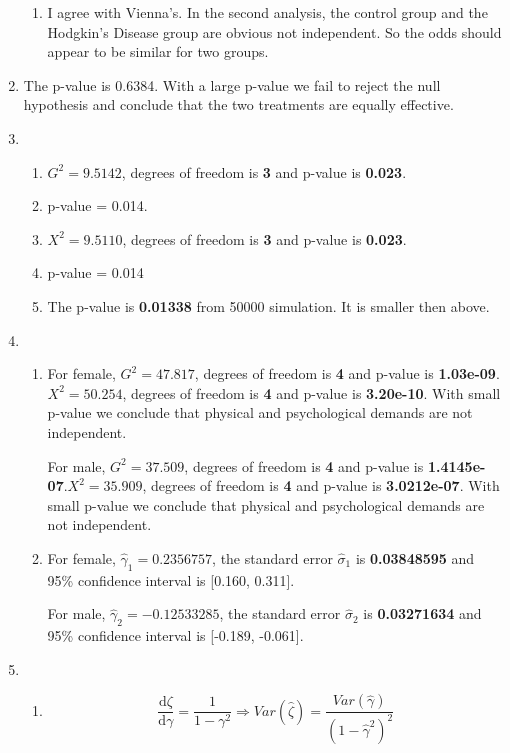 \documentclass{article}
\begin{document}
\begin{enumerate}[leftmargin = 0 em, label = \arabic*., font = \bfseries]
\begin{enumerate}
		\item 
		I agree with Vienna's. In the second analysis, the control group and the Hodgkin's Disease group are obvious not independent. So the odds should appear to be similar for two groups.
	\end{enumerate}
	\item 
		The p-value is 0.6384. With a large p-value we fail to reject the null hypothesis and conclude that the two treatments are equally effective.
		\item
		\begin{enumerate}

		\item 
		$G^2 = 9.5142$, degrees of freedom is \textbf{3} and p-value is \textbf{0.023}.
	
		\item 
	
		p-value = 0.014.
		\item 
		$X^2 = 9.5110$, degrees of freedom is \textbf{3} and p-value is \textbf{0.023}.
	
		\item 
		p-value = 0.014
		\item 
		The p-value is \textbf{0.01338} from 50000 simulation. It is smaller then above.
	\end{enumerate}

	\item 
	\begin{enumerate}
		\item 
		For female, $G^2 = 47.817$, degrees of freedom is \textbf{4} and p-value is \textbf{1.03e-09}.$X^2 = 50.254$, degrees of freedom is \textbf{4} and p-value is \textbf{3.20e-10}. With small p-value we conclude that physical and psychological demands are not independent.

		For male, $G^2 = 37.509$, degrees of freedom is \textbf{4} and p-value is \textbf{1.4145e-07}.$X^2 = 35.909$, degrees of freedom is \textbf{4} and p-value is \textbf{3.0212e-07}. With small p-value we conclude that physical and psychological demands are not independent.
		\item 
		For female, $\hat{\gamma}_1 = 0.2356757$, the standard error $\hat{\sigma}_1$ is \textbf{ 0.03848595} and 95\% confidence interval is [0.160, 0.311].

		For male, $\hat{\gamma}_2 = -0.12533285$, the standard error $\hat{\sigma}_2$ is \textbf{0.03271634} and 95\% confidence interval is [-0.189, -0.061].

	\end{enumerate}
	\item 
	\begin{enumerate}
		\item 
		\[\frac{\mathrm{d}\zeta}{\mathrm{d}\gamma} = \frac{1}{1 - \gamma^2} \Rightarrow Var(\hat{\zeta}) = \frac{Var(\hat{\gamma})}{(1 - \hat{\gamma}^2)^2}\]


\end{enumerate}
\end{enumerate}
\end{document}

